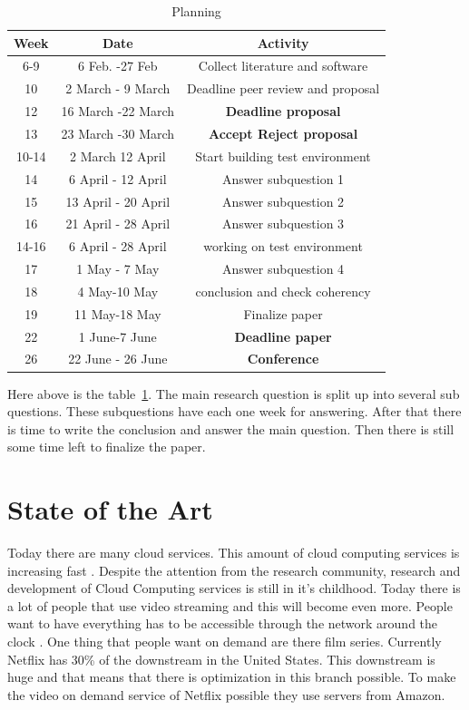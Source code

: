 \documentclass{sig-alternate-br}
\begin{document}
\begin{table}[H]
	\centering \caption{Planning}
\begin{tabular}{|c|c|c|} \hline
		\textbf{Week} & \textbf{Date} & \textbf{Activity} \\ \hline 
		6-9& 6 Feb. -27 Feb& Collect literature and software\\ \hline 
		10& 2 March - 9 March& Deadline peer review and proposal \\ \hline
		12& 16 March -22 March & \textbf{Deadline proposal} \\ \hline
		13 & 23 March -30 March &  \textbf{Accept Reject proposal} \\ \hline
		10-14& 2 March 12 April& Start building test environment \\ \hline
		14& 6 April - 12 April& Answer subquestion 1  \\ \hline
		15& 13 April - 20 April& Answer subquestion 2\\ \hline
		16& 21 April - 28 April& Answer subquestion 3\\ \hline
		14-16 & 6 April - 28 April & working on test environment \\ \hline
		17& 1 May - 7 May & Answer subquestion 4 \\ \hline
		18& 4 May-10 May& conclusion and check coherency \\ \hline
		19& 11 May-18 May& Finalize paper \\ \hline
		22& 1 June-7 June&  \textbf{Deadline paper} \\ \hline
		26 &22 June - 26 June & \textbf{Conference} \\ \hline
		\end{tabular}

		\label{tab:planning}
\end{table}
Here above is the table~\ref{tab:planning}. The main research question is split up into several sub questions. These subquestions have each one week for answering. After that there is time to write the conclusion and answer the main question. Then there is still some time left to finalize the paper. 

\section{State of the Art}
Today there are many cloud services. This amount of cloud computing services is increasing fast \cite{armbrust:2009}.  Despite the attention
from the research community, research and development of
Cloud Computing services is still in it's childhood\cite{tso:2013}. Today there is a lot of people that use video streaming and this will become even more. People want to have everything has to be accessible through the network around the clock \cite{youseff:2008}. One thing that people want on demand are there film series. Currently Netflix has 30\% of the downstream in the United States. This downstream is huge and that means that there is optimization in this branch possible. To make the video on demand service of Netflix possible they use servers from Amazon. 
\end{document}
